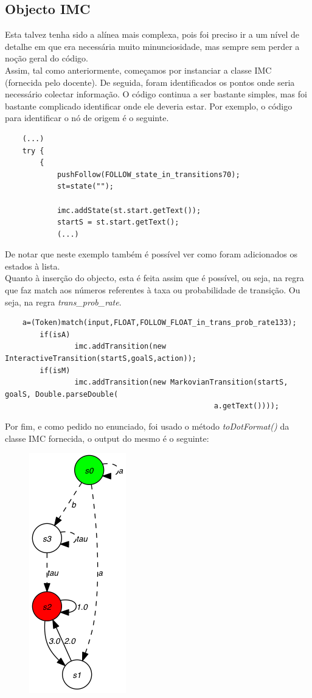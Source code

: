\documentclass[a4paper,11pt,openright,openbib]{article}
\begin{document}
\subsection{Objecto IMC} %
\label{sub:todotformat}
Esta talvez tenha sido a alínea mais complexa, pois foi preciso ir a um nível de detalhe em que era necessária muito minunciosidade, mas sempre sem perder a noção geral do código.\\
Assim, tal como anteriormente, começamos por instanciar a classe IMC (fornecida pelo docente). De seguida, foram identificados os pontos onde seria necessário colectar informação. O código continua a ser bastante simples, mas foi bastante complicado identificar onde ele deveria estar. Por exemplo, o código para identificar o nó de origem é o seguinte.
\small
\begin{verbatim}
    (...)
    try {
        {
            pushFollow(FOLLOW_state_in_transitions70);
            st=state("");			
            
            imc.addState(st.start.getText());
            startS = st.start.getText();
            (...)            
\end{verbatim}
\normalsize
De notar que neste exemplo também é possível ver como foram adicionados os estados à lista. \\
Quanto à inserção do objecto, esta é feita assim que é possível, ou seja, na regra que faz match aos números referentes à taxa ou probabilidade de transição. Ou seja, na regra \emph{trans\_prob\_rate}.
\small
\begin{verbatim}
    a=(Token)match(input,FLOAT,FOLLOW_FLOAT_in_trans_prob_rate133); 				
        if(isA) 
	            imc.addTransition(new InteractiveTransition(startS,goalS,action));					
        if(isM)
	            imc.addTransition(new MarkovianTransition(startS, goalS, Double.parseDouble(
	                                            a.getText())));
\end{verbatim}
\normalsize
Por fim, e como pedido no enunciado, foi usado o método \emph{toDotFormat()} da classe IMC fornecida, o output do mesmo é o seguinte:
\begin{figure}[!htp]
	\centering	
		\includegraphics[scale=0.7]{dotIMC.png}		
\end{figure} 
\end{document}
